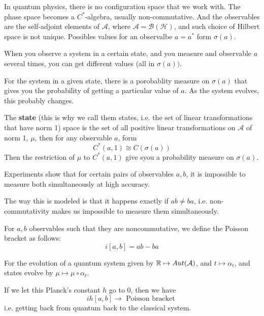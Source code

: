 In quantum physics, there is no configuration space that we work with. The phase space becomes a $C^*$-algebra, usually non-commutative. And the observables are the self-adjoint elements of $\mathcal{A}$, where $\mathcal{A}=\mathcal{B}(\mathcal{H})$, and such choice of Hilbert space is not unique. Possibles values for an observalbe $a=a^*$ form $\sigma(a)$.

When you observe a system in a certain state, and you measure and observable $a$ several times, you can get different values (all in $\sigma(a))$.

For the system in a given state, there is a porobablity measure on $\sigma(a)$ that gives you the probability of getting a particular value of $a$. As the system evolves, this probably changes.

The \textbf{state} (this is why we call them states, i.e. the set of linear transformations that have norm 1) space is the set of all positive linear transformations on $\mathcal{A}$ of norm 1, $\mu$, then for any observable $a$, form 
\begin{equation*}
    C^*(a,1)\cong C(\sigma(a))
\end{equation*}
Then the restriction  of $\mu$ to $C^*(a,1)$ give syou a probability measure on $\sigma(a)$.

Experiments show that for certain pairs of observables $a,b$, it is impossible to measure both simultaneously at high accuracy.

The way this is modeled is that it happens exactly if $ab\neq ba$, i.e. non-commutativity makes us impossible to measure them simultaneously.

\begin{definition}
    For $a,b$ observables such that they are noncommutative, we define the Poisson bracket as follows:
    \begin{equation*}
        i[a,b]=ab-ba
    \end{equation*}
\end{definition}

For the evolution of a quantum system given by $\mathbb{R}\mapsto Aut(\mathcal{A})$, and $t\mapsto \alpha_t$, and states evolve by $\mu\mapsto \mu\circ\alpha_t$.

If we let this Planck's constant $h$ go to 0, then we have
\begin{equation*}
    ih[a,b]\to \text{ Poisson bracket }
\end{equation*}
i.e. getting back from quantum back to the classical system.

